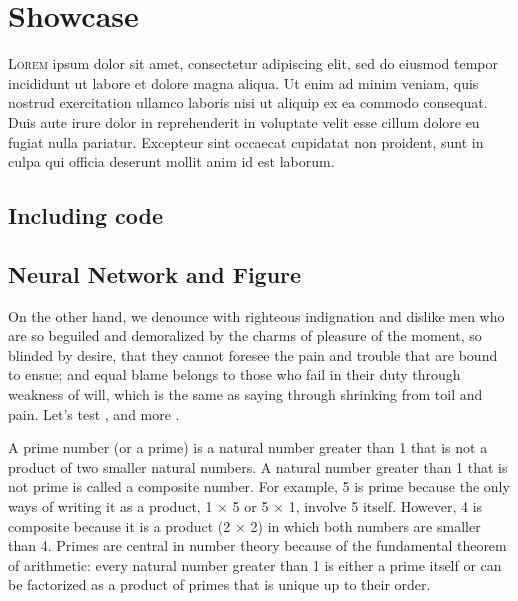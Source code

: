 

\chapter{Showcase}



\lettrine{L}{orem} ipsum dolor sit amet, consectetur adipiscing elit, sed do
eiusmod tempor incididunt ut labore et dolore magna aliqua. Ut enim ad minim
veniam, quis nostrud exercitation ullamco laboris nisi ut aliquip ex ea commodo
consequat. Duis aute irure dolor in reprehenderit in voluptate velit esse cillum
dolore eu fugiat nulla pariatur. Excepteur sint occaecat cupidatat non proident,
sunt in culpa qui officia deserunt mollit anim id est laborum.


\section{Including code}



\section{Neural Network and Figure}

On the other hand, we denounce with righteous indignation and dislike men who
are so beguiled and demoralized by the charms of pleasure of the moment, so
blinded by desire, that they cannot foresee the pain and trouble that are bound
to ensue; and equal blame belongs to those who fail in their duty through
weakness of will, which is the same as saying through shrinking from toil and
pain. Let's test \autocite{vaswani17:atten_all_you_need}, and more
\autocite{vaswani17:atten_all_you_need}.

A prime number (or a prime) is a natural number greater than 1 that is not a
product of two smaller natural numbers. A natural number greater than 1 that is
not prime is called a composite number. For example, 5 is prime because the only
ways of writing it as a product, 1 × 5 or 5 × 1, involve 5 itself. However, 4 is
composite because it is a product (2 × 2) in which both numbers are smaller than
4. Primes are central in number theory because of the fundamental theorem of
arithmetic: every natural number greater than 1 is either a prime itself or can
be factorized as a product of primes that is unique up to their order.

